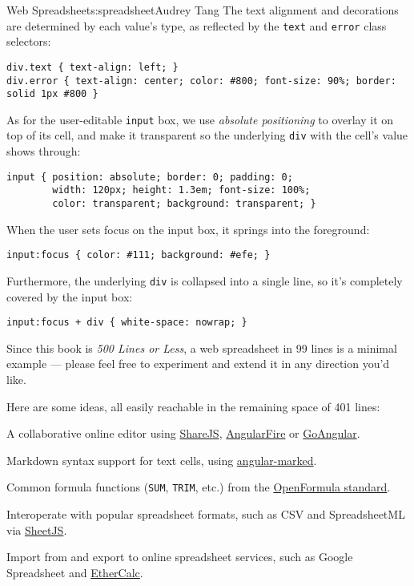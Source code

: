 \begin{aosachapter}{Web Spreadsheet}{s:spreadsheet}{Audrey Tang}
The text alignment and decorations are determined by each value's type,
as reflected by the \texttt{text} and \texttt{error} class selectors:

\begin{verbatim}
div.text { text-align: left; }
div.error { text-align: center; color: #800; font-size: 90%; border: solid 1px #800 }
\end{verbatim}

As for the user-editable \texttt{input} box, we use \emph{absolute
positioning} to overlay it on top of its cell, and make it transparent
so the underlying \texttt{div} with the cell's value shows through:

\begin{verbatim}
input { position: absolute; border: 0; padding: 0;
        width: 120px; height: 1.3em; font-size: 100%;
        color: transparent; background: transparent; }
\end{verbatim}

When the user sets focus on the input box, it springs into the
foreground:

\begin{verbatim}
input:focus { color: #111; background: #efe; }
\end{verbatim}

Furthermore, the underlying \texttt{div} is collapsed into a single
line, so it's completely covered by the input box:

\begin{verbatim}
input:focus + div { white-space: nowrap; }
\end{verbatim}

\label{conclusion}

Since this book is \emph{500 Lines or Less}, a web spreadsheet in 99
lines is a minimal example --- please feel free to experiment and extend
it in any direction you'd like.

Here are some ideas, all easily reachable in the remaining space of 401
lines:

\begin{aosaitemize}

\item
  A collaborative online editor using
  \href{http://sharejs.org/}{ShareJS},
  \href{http://angularfire.com}{AngularFire} or
  \href{http://goangular.org/}{GoAngular}.
\item
  Markdown syntax support for text cells, using
  \href{http://ngmodules.org/modules/angular-marked}{angular-marked}.
\item
  Common formula functions (\texttt{SUM}, \texttt{TRIM}, etc.) from the
  \href{https://en.wikipedia.org/wiki/OpenFormula}{OpenFormula
  standard}.
\item
  Interoperate with popular spreadsheet formats, such as CSV and
  SpreadsheetML via \href{http://sheetjs.com/}{SheetJS}.
\item
  Import from and export to online spreadsheet services, such as Google
  Spreadsheet and \href{http://ethercalc.net/}{EtherCalc}.
\end{aosaitemize}


\end{aosachapter}

